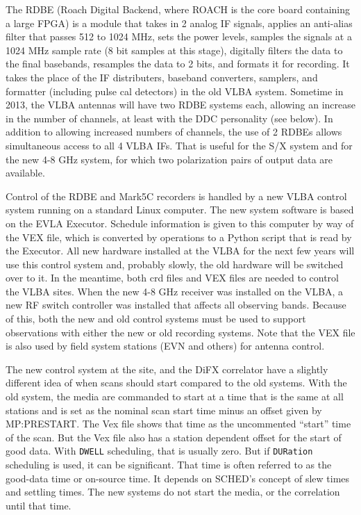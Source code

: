 \documentclass{report}
\newcommand{\sched}{{\sc SCHED}}
\begin{document}
The RDBE (Roach Digital Backend, where ROACH is the core board
containing a large FPGA) is a module that takes in 2 analog IF
signals, applies an anti-alias filter that passes 512 to 1024 MHz,
sets the power levels, samples the signals at a 1024 MHz sample rate
(8 bit samples at this stage), digitally filters the data to the final
basebands, resamples the data to 2 bits, and formats it for recording.
It takes the place of the IF distributers, baseband converters,
samplers, and formatter (including pulse cal detectors) in the old
VLBA system.  Sometime in 2013, the VLBA antennas will have two RDBE
systems each, allowing an increase in the number of channels, at least
with the DDC personality (see below).  In addition to allowing
increased numbers of channels, the use of 2 RDBEs allows simultaneous
access to all 4 VLBA IFs.  That is useful for the S/X system and for
the new 4-8 GHz system, for which two polarization pairs of output
data are available.

Control of the RDBE and Mark5C recorders is handled by a new VLBA
control system running on a standard Linux computer.  The new system
software is based on the EVLA Executor.  Schedule information is given
to this computer by way of the VEX file, which is converted by
operations to a Python script that is read by the Executor.  All new
hardware installed at the VLBA for the next few years will use this
control system and, probably slowly, the old hardware will be switched
over to it.  In the meantime, both crd files and VEX files are needed
to control the VLBA sites.  When the new 4-8 GHz receiver was
installed on the VLBA, a new RF switch controller was installed that
affects all observing bands.  Because of this, both the new and old
control systems must be used to support observations with either the
new or old recording systems.  Note that the VEX file is also used by
field system stations (EVN and others) for antenna control.

The new control system at the site, and the DiFX correlator have a 
slightly different idea of when scans should start compared to the
old systems.  With the old system, the media are commanded to start
at a time that is the same at all stations and is set as the nominal
scan start time minus an offset given by 
{MP:PRESTART}.  The Vex file shows that time as the uncommented 
``start'' time of the scan.  But the Vex file also has a station
dependent offset for the start of good data.  With {\tt DWELL}
scheduling, that is usually zero.  But if {\tt DURation} scheduling
is used, it can be significant.  That time is often referred to
as the good-data time or on-source time.  It depends on \sched's
concept of slew times and settling times.  The new systems do not 
start the media, or the correlation until that time.
\end{document}

